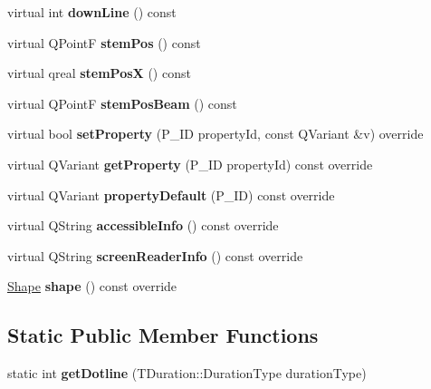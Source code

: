 \begin{DoxyCompactItemize}
virtual int {\bfseries down\+Line} () const
\item 
\mbox{\label{class_ms_1_1_rest_a5fc4ea837277a8cf153d222eba1b704f}} 
virtual Q\+PointF {\bfseries stem\+Pos} () const
\item 
\mbox{\label{class_ms_1_1_rest_a16d7228ced4cd66fee3a82de5c09601b}} 
virtual qreal {\bfseries stem\+PosX} () const
\item 
\mbox{\label{class_ms_1_1_rest_a323a0f7a7c607ec33a6b14da5bffad77}} 
virtual Q\+PointF {\bfseries stem\+Pos\+Beam} () const
\item 
\mbox{\label{class_ms_1_1_rest_a8f7561748710e2d43df0983279a03917}} 
virtual bool {\bfseries set\+Property} (P\+\_\+\+ID property\+Id, const Q\+Variant \&v) override
\item 
\mbox{\label{class_ms_1_1_rest_a2365f7f56d87dcfe6365fd47f5d135dc}} 
virtual Q\+Variant {\bfseries get\+Property} (P\+\_\+\+ID property\+Id) const override
\item 
\mbox{\label{class_ms_1_1_rest_aaed36e0559a7fdad32492f40d06a9a4f}} 
virtual Q\+Variant {\bfseries property\+Default} (P\+\_\+\+ID) const override
\item 
\mbox{\label{class_ms_1_1_rest_aa4c7809f3f4c27c971635790dcadb65e}} 
virtual Q\+String {\bfseries accessible\+Info} () const override
\item 
\mbox{\label{class_ms_1_1_rest_a8cdd93a48ae5af603a688e3e4d7fc8c3}} 
virtual Q\+String {\bfseries screen\+Reader\+Info} () const override
\item 
\mbox{\label{class_ms_1_1_rest_a406689bc9c20997f1bf0251a1fc4ae9d}} 
\hyperlink{class_ms_1_1_shape}{Shape} {\bfseries shape} () const override
\end{DoxyCompactItemize}
\subsection*{Static Public Member Functions}
\begin{DoxyCompactItemize}
\item 
\mbox{\label{class_ms_1_1_rest_af21fe2188d61b3e9a5952ddd70e2597a}} 
static int {\bfseries get\+Dotline} (T\+Duration\+::\+Duration\+Type duration\+Type)
\end{DoxyCompactItemize}
